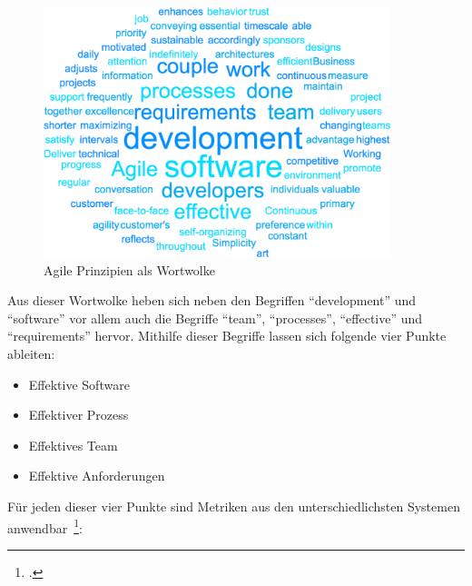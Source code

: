 \begin{savenotes}
  \begin{figure}[H] 
    \centering
    \includegraphics[width=0.9\textwidth]{img/principles-wordcloud.png}
    \caption{Agile Prinzipien als Wortwolke}\label{fig:wordcloud_principles}
  \end{figure}
\end{savenotes}

Aus dieser Wortwolke heben sich neben den Begriffen ``development'' und ``software'' vor allem auch die Begriffe ``team'', ``processes'', ``effective'' und ``requirements'' hervor.
Mithilfe dieser Begriffe lassen sich folgende vier Punkte ableiten:

\begin{itemize}[noitemsep]
  \item Effektive Software
  \item Effektiver Prozess
  \item Effektives Team 
  \item Effektive Anforderungen 
\end{itemize}

Für jeden dieser vier Punkte sind Metriken aus den unterschiedlichsten Systemen anwendbar~\footcite[vgl.][S.219ff]{davis_agile_2015}:

